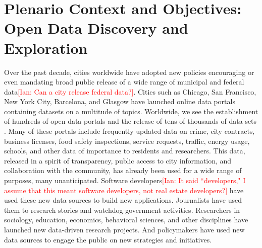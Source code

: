 \documentclass[11pt]{article}
\newcommand{\ian}[1]{\textcolor{Red}{[Ian: #1]}}
\newcommand{\ian}[1]{}
\begin{document}
\section{Plenario Context and Objectives: Open Data Discovery and Exploration}
\label{sec:context-objective}
Over the past decade, cities worldwide have adopted new policies encouraging or even mandating broad public release of a wide range of municipal and federal data\ian{Can a city release federal data?}. 
Cities such as Chicago, San Francisco, New York City, Barcelona, and Glasgow have launched online data portals containing datasets on a multitude of topics.
Worldwide, we see the establishment of hundreds of open data portals and the release of tens
 of thousands of data sets \cite{maksimovic_2011}.  Many of these portals include frequently updated data on crime, city contracts, business licenses, food safety inspections, service requests, traffic, energy usage, schools, and other data of importance to residents and researchers. This data, released in a spirit of transparency, public access to city information, and collaboration with the community, has already been used for a wide range of purposes, many unanticipated. Software developers\ian{It said ``developers," I assume that this meant software developers, not real estate developers?} have used these new data sources to build new applications. Journalists have used them to research stories and watchdog government activities. Researchers in sociology, education, economics, behavioral sciences, and other disciplines have launched new data-driven research projects. And policymakers have used new data sources to engage the public on new strategies and initiatives. 
 
\end{document}
